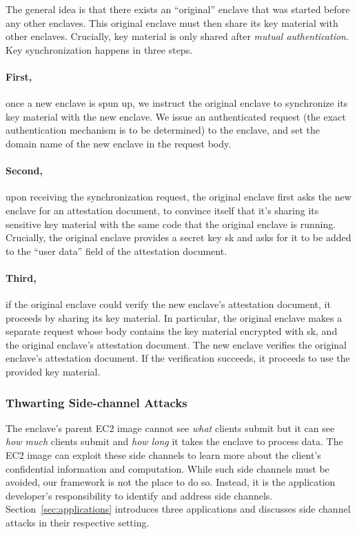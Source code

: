 The general idea is that there exists an ``original'' enclave that was started
before any other enclaves. This original enclave must then share its key
material with other enclaves.  Crucially, key material is only shared after
\emph{mutual authentication}.  Key synchronization happens in three steps.


\paragraph{First,} once a new enclave is spun up, we instruct the original
enclave to synchronize its key material with the new enclave. We issue an
authenticated request (the exact authentication mechanism is to be determined)
to the enclave, and set the domain name of the new enclave in the request body.

\paragraph{Second,} upon receiving the synchronization request, the original
enclave first asks the new enclave for an attestation document, to convince
itself that it’s sharing its sensitive key material with the same code that the
original enclave is running. Crucially, the original enclave provides a secret
key sk and asks for it to be added to the “user data” field of the attestation
document.

\paragraph{Third,} if the original enclave could verify the new enclave’s
attestation document, it proceeds by sharing its key material. In particular,
the original enclave makes a separate request whose body contains the key
material encrypted with sk, and the original enclave’s attestation document.
The new enclave verifies the original enclave’s attestation document. If the
verification succeeds, it proceeds to use the provided key material.

\subsubsection{Thwarting Side-channel Attacks}
\label{sec:side-channels}

The enclave's parent EC2 image cannot see \emph{what} clients submit but it can
see \emph{how much} clients submit and \emph{how long} it takes the enclave to
process data.  The EC2 image can exploit these side channels to learn more
about the client's confidential information and computation.  While such side
channels must be avoided, our framework is not the place to do so.  Instead, it
is the application developer's responsibility to identify and address side
channels.  Section~\ref{sec:applications} introduces three applications and
discusses side channel attacks in their respective setting.

